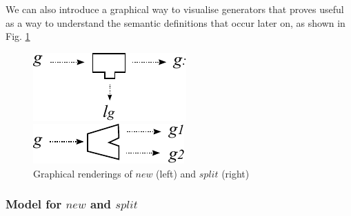 We can also introduce a graphical way to visualise
generators that proves useful as a way to understand
the semantic definitions that occur later on,
as shown in Fig. \ref{fig:new-and-split}
\begin{figure}%
  \centering
  \parbox{1.2in}{\includegraphics{images/new-label}}%
  \qquad\qquad
  \begin{minipage}{1.2in}%
    \includegraphics{images/split-gen}
  \end{minipage}%
  \caption{Graphical renderings of $new$ (left) and $split$ (right)}%
  \label{fig:new-and-split}%
\end{figure}



\subsubsection{Model for $new$ and $split$}


